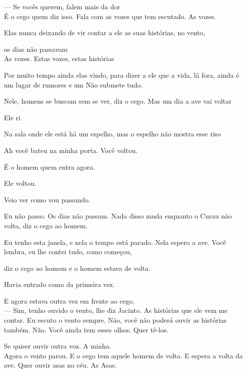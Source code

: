 --- Se vocês querem, falem mais da dor\\

É o cego quem diz isso. Fala com as vozes que tem escutado. As vozes.

Elas nunca deixando de vir contar a ele as suas histórias, no vento,

os dias não passavam\\

As vozes. Estas vozes, estas histórias

Por muito tempo ainda elas vindo, para dizer a ele que a vida, lá fora,
ainda é um lugar de rumores e um Não submete tudo.

Nele, homens se buscam sem se ver, diz o cego. Mas um dia a ave vai
voltar

Ele ri.

Na sala onde ele está há um espelho, mas o espelho não mostra esse riso

\pagebreak

\clearpage
\thispagestyle{empty}

\movetooddpage

\vspace*{4cm}

Ah você bateu na minha porta. Você voltou.

É o homem quem entra agora.

Ele voltou.

Veio ver como vou passando.

Eu não passo. Os dias não passam. Nada disso muda enquanto o Curau não
volta, diz o cego ao homem.

Eu tenho esta janela, e nela o tempo está parado. Nela espero a ave.
Você lembra, eu lhe contei tudo, como começou,

diz o cego ao homem e o homem estava de volta.

Havia entrado como da primeira vez.

E agora estava outra vez em frente ao cego.\\

--- Sim, tenho ouvido o vento, lhe diz Jacinto. As histórias que ele vem
me contar. Eu escuto o vento sempre. Não, você não poderá ouvir as
histórias também. Não. Você ainda tem esses olhos. Quer tê-los.

Se quiser ouvir outra voz. A minha.\\

Agora o vento parou. E o cego tem aquele homem de volta. E espera a
volta da ave. Quer ouvir asas no céu. As Asas.\\

